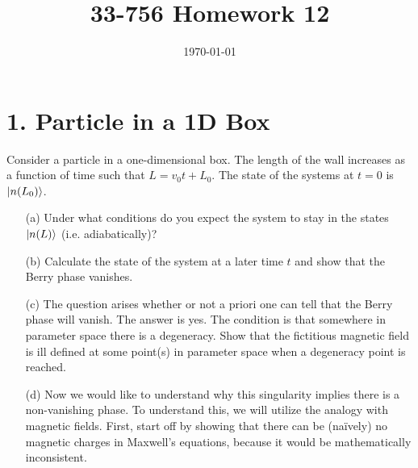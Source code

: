\documentclass[a4paper,twoside]{article}
\title{33-756 Homework 12}
\date{\today}
\begin{document}
\maketitle
\section*{1. Particle in a 1D Box}
Consider a particle in a one-dimensional box. The length of the wall increases as a function of time such that $ L = v_0 t + L_0 $. The state of the systems at $ t = 0 $ is $\ket{n(L_0)} $.
\begin{itemize}
    \item[(a)] Under what conditions do you expect the system to stay in the states $\ket{n(L)} $ (i.e. adiabatically)?
        \begin{problem}
            
        \end{problem}
    \item[(b)] Calculate the state of the system at a later time $ t $ and show that the Berry phase vanishes.
        \begin{problem}
            
        \end{problem}
    \item[(c)] The question arises whether or not a priori one can tell that the Berry phase will vanish. The answer is yes. The condition is that somewhere in parameter space there is a degeneracy. Show that the fictitious magnetic field is ill defined at some point(s) in parameter space when a degeneracy point is reached.
        \begin{problem}
            
        \end{problem}
    \item[(d)] Now we would like to understand why this singularity implies there is a non-vanishing phase. To understand this, we will utilize the analogy with magnetic fields. First, start off by showing that there can be (na\"ively) no magnetic charges in Maxwell's equations, because it would be mathematically inconsistent.
        \begin{problem}
            

\end{problem}
\end{itemize}
\end{document}
